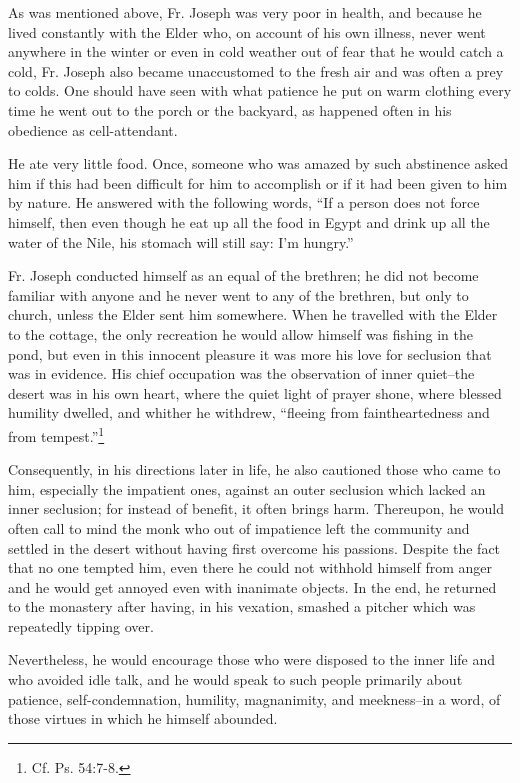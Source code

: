 As was mentioned above, Fr. Joseph was very poor in health, and because he lived constantly with the Elder who, on account of his own illness, never went anywhere in the winter or even in cold weather out of fear that he would catch a cold, Fr. Joseph also became unaccustomed to the fresh air and was often a prey to colds. One should have seen with what patience he put on warm clothing every time he went out to the porch or the backyard, as happened often in his obedience as cell-attendant.

He ate very little food. Once, someone who was amazed by such abstinence asked him if this had been difficult for him to accomplish or if it had been given to him by nature. He answered with the following words, ``If a person does not force himself, then even though he eat up all the food in Egypt and drink up all the water of the Nile, his stomach will still say: I'm hungry.''

Fr. Joseph conducted himself as an equal of the brethren; he did not become familiar with anyone and he never went to any of the brethren, but only to church, unless the Elder sent him somewhere. When he travelled with the Elder to the cottage, the only recreation he would allow himself was fishing in the pond, but even in this innocent pleasure it was more his love for seclusion that was in evidence. His chief occupation was the observation of inner quiet--the desert was in his own heart, where the quiet light of prayer shone, where blessed humility dwelled, and whither he withdrew, ``fleeing from faintheartedness and from tempest.''\footnote{Cf. Ps. 54:7-8.}

Consequently, in his directions later in life, he also cautioned those who came to him, especially the impatient ones, against an outer seclusion which lacked an inner seclusion; for instead of benefit, it often brings harm. Thereupon, he would often call to mind the monk who out of impatience left the community and settled in the desert without having first overcome his passions. Despite the fact that no one tempted him, even there he could not withhold himself from anger and he would get annoyed even with inanimate objects. In the end, he returned to the monastery after having, in his vexation, smashed a pitcher which was repeatedly tipping over.

Nevertheless, he would encourage those who were disposed to the inner life and who avoided idle talk, and he would speak to such people primarily about patience, self-condemnation, humility, magnanimity, and meekness--in a word, of those virtues in which he himself abounded.

